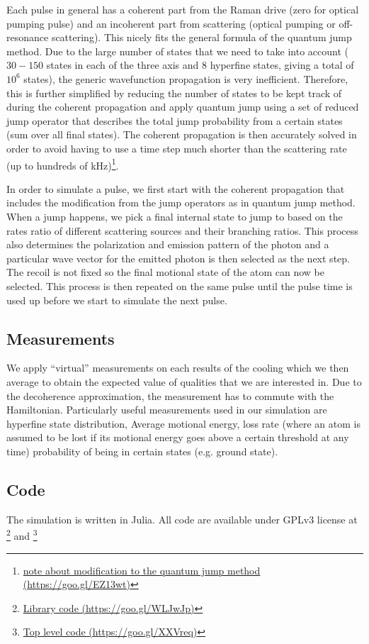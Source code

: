 \documentclass[aps,twocolumn,secnumarabic,balancelastpage,amsmath,amssymb]{revtex4}
\begin{document}
Each pulse in general has a coherent part from the Raman drive (zero for optical pumping pulse)
and an incoherent part from scattering (optical pumping or off-resonance scattering).
This nicely fits the general formula of the quantum jump method. Due to the large number of
states that we need to take into account ($30-150$ states in each of the three axis and
$8$ hyperfine states, giving a total of $10^6$ states),
the generic wavefunction propagation is very inefficient.
Therefore, this is further simplified by reducing the number of states to be kept track of during
the coherent propagation and apply quantum jump using a set of reduced jump operator that
describes the total jump probability from a certain states (sum over all final states).
The coherent propagation is then accurately solved in order to avoid having to use a time step
much shorter than the scattering rate (up to hundreds of kHz)\footnote{\href{https://goo.gl/EZ13wt}{note about modification to the quantum jump method (https://goo.gl/EZ13wt)}}.

In order to simulate a pulse, we first start with the coherent propagation that includes the
modification from the jump operators as in quantum jump method.
When a jump happens, we pick a final internal state to jump to based on the rates ratio
of different scattering sources and their branching ratios.
This process also determines the polarization and emission pattern of the photon and
a particular wave vector for the emitted photon is then selected as the next step.
The recoil is not fixed so the final motional state of the atom can now be selected.
This process is then repeated on the same pulse until the pulse time is used up before
we start to simulate the next pulse.

\subsection{Measurements}

We apply ``virtual'' measurements on each results of the cooling which we then average to
obtain the expected value of qualities that we are interested in.
Due to the decoherence approximation, the measurement has to commute with the Hamiltonian.
Particularly useful measurements used in our simulation are hyperfine state distribution,
Average motional energy, loss rate (where an atom is assumed to be lost if its motional energy
goes above a certain threshold at any time) probability of being in certain states
(e.g. ground state).

\subsection{Code}

The simulation is written in Julia. All code are available under GPLv3 license at
\footnote{\href{https://goo.gl/WLJwJp}{Library code (https://goo.gl/WLJwJp)}} and
\footnote{\href{https://goo.gl/XXVreq}{Top level code (https://goo.gl/XXVreq)}}


\end{document}
